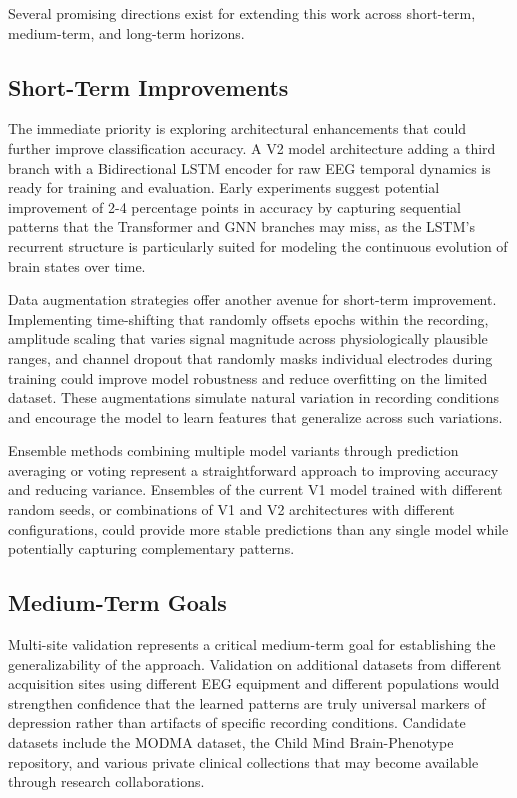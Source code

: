 Several promising directions exist for extending this work across short-term, medium-term, and long-term horizons.

\subsection{Short-Term Improvements}

The immediate priority is exploring architectural enhancements that could further improve classification accuracy. A V2 model architecture adding a third branch with a Bidirectional LSTM encoder for raw EEG temporal dynamics is ready for training and evaluation. Early experiments suggest potential improvement of 2-4 percentage points in accuracy by capturing sequential patterns that the Transformer and GNN branches may miss, as the LSTM's recurrent structure is particularly suited for modeling the continuous evolution of brain states over time.

Data augmentation strategies offer another avenue for short-term improvement. Implementing time-shifting that randomly offsets epochs within the recording, amplitude scaling that varies signal magnitude across physiologically plausible ranges, and channel dropout that randomly masks individual electrodes during training could improve model robustness and reduce overfitting on the limited dataset. These augmentations simulate natural variation in recording conditions and encourage the model to learn features that generalize across such variations.

Ensemble methods combining multiple model variants through prediction averaging or voting represent a straightforward approach to improving accuracy and reducing variance. Ensembles of the current V1 model trained with different random seeds, or combinations of V1 and V2 architectures with different configurations, could provide more stable predictions than any single model while potentially capturing complementary patterns.

\subsection{Medium-Term Goals}

Multi-site validation represents a critical medium-term goal for establishing the generalizability of the approach. Validation on additional datasets from different acquisition sites using different EEG equipment and different populations would strengthen confidence that the learned patterns are truly universal markers of depression rather than artifacts of specific recording conditions. Candidate datasets include the MODMA dataset, the Child Mind Brain-Phenotype repository, and various private clinical collections that may become available through research collaborations.

